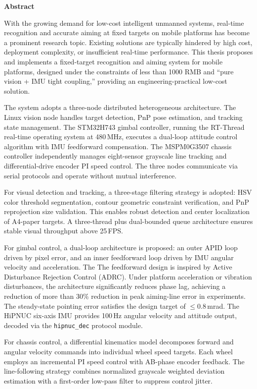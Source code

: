 ﻿%


\begin{center}\heiti\sanhao\textbf{
        Abstract
    }
\end{center}

With the growing demand for low-cost intelligent unmanned systems, real-time recognition and accurate aiming at fixed targets on mobile platforms has become a prominent research topic. Existing solutions are typically hindered by high cost, deployment complexity, or insufficient real-time performance. This thesis proposes and implements a fixed-target recognition and aiming system for mobile platforms, designed under the constraints of less than 1000 RMB and ``pure vision + IMU tight coupling,'' providing an engineering-practical low-cost solution.

The system adopts a three-node distributed heterogeneous architecture. The Linux vision node handles target detection, PnP pose estimation, and tracking state management. The STM32H743 gimbal controller, running the RT-Thread real-time operating system at 480\,MHz, executes a dual-loop attitude control algorithm with IMU feedforward compensation. The MSPM0G3507 chassis controller independently manages eight-sensor grayscale line tracking and differential-drive encoder PI speed control. The three nodes communicate via serial protocols and operate without mutual interference.

For visual detection and tracking, a three-stage filtering strategy is adopted: HSV color threshold segmentation, contour geometric constraint verification, and PnP reprojection size validation. This enables robust detection and center localization of A4-paper targets. A three-thread plus dual-bounded queue architecture ensures stable visual throughput above 25\,FPS.

For gimbal control, a dual-loop architecture is proposed: an outer APID loop driven by pixel error, and an inner feedforward loop driven by IMU angular velocity and acceleration. The The feedforward design is inspired by Active Disturbance Rejection Control (ADRC). Under platform acceleration or vibration disturbances, the architecture significantly reduces phase lag, achieving a reduction of more than 30\% reduction in peak aiming-line error in experiments. The steady-state pointing error satisfies the design target of $\leq$0.8\,mrad. The HiPNUC six-axis IMU provides 100\,Hz angular velocity and attitude output, decoded via the \texttt{hipnuc\_dec} protocol module.

For chassis control, a differential kinematics model decomposes forward and angular velocity commands into individual wheel speed targets. Each wheel employs an incremental PI speed control with AB-phase encoder feedback. The line-following strategy combines normalized grayscale weighted deviation estimation with a first-order low-pass filter to suppress control jitter. 

